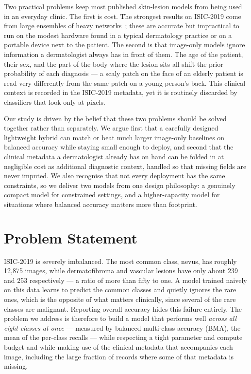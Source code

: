 Two practical problems keep most published skin-lesion models from being used in
an everyday clinic. The first is cost. The strongest results on ISIC-2019 come
from large ensembles of heavy networks~\cite{isic2019leaderboard,gessert2020ensembles};
these are accurate but impractical to run on the modest hardware found in a
typical dermatology practice or on a portable device next to the patient. The
second is that image-only models ignore information a dermatologist always has
in front of them. The age of the patient, their sex, and the part of the body
where the lesion sits all shift the prior probability of each diagnosis --- a
scaly patch on the face of an elderly patient is read very differently from the
same patch on a young person's back. This clinical context is recorded in the
ISIC-2019 metadata, yet it is routinely discarded by classifiers that look only
at pixels.

Our study is driven by the belief that these two problems should be solved
together rather than separately. We argue first that a carefully designed
lightweight hybrid can match or beat much larger image-only baselines on
balanced accuracy while staying small enough to deploy, and second that the
clinical metadata a dermatologist already has on hand can be folded in at
negligible cost as additional diagnostic context, handled so that missing
fields are never imputed. We
also recognise that not every deployment has the same constraints, so we deliver
two models from one design philosophy: a genuinely compact model for
constrained settings, and a higher-capacity model for situations where balanced
accuracy matters more than footprint.

\section{Problem Statement}

ISIC-2019 is severely imbalanced. The most common class, nevus, has roughly
12{,}875 images, while dermatofibroma and vascular lesions have only about 239
and 253 respectively --- a ratio of more than fifty to one. A model trained
naively on this data learns to predict the common classes and quietly ignores
the rare ones, which is the opposite of what matters clinically, since several
of the rare classes are malignant. Reporting overall accuracy hides this failure
entirely. The problem we address is therefore to build a model that performs
well \emph{across all eight classes at once} --- measured by balanced
multi-class accuracy (BMA), the mean of the per-class recalls --- while
respecting a tight parameter and compute budget and while making use of the
clinical metadata that accompanies each image, including the large fraction of
records where some of that metadata is missing.

